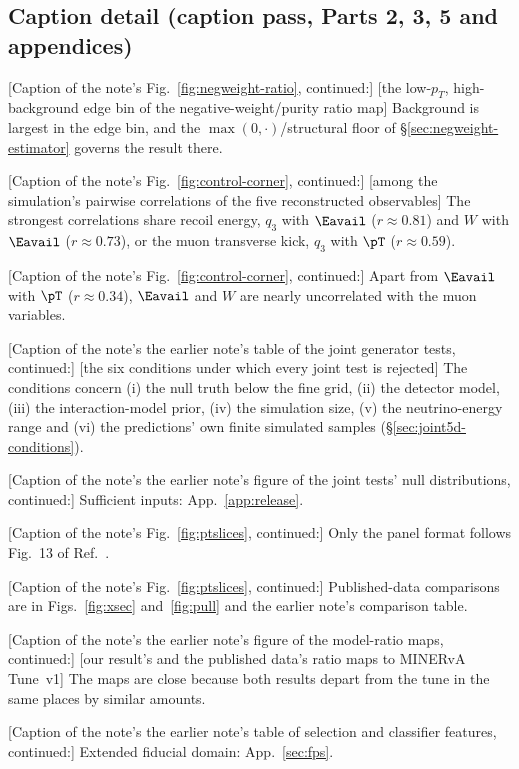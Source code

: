 \subsection{Caption detail (caption pass, Parts 2, 3, 5 and appendices)}

[Caption of the note's Fig.~\ref{fig:negweight-ratio}, continued:] [the low-$p_T$, high-background edge bin of the negative-weight/purity ratio map] Background is largest in the edge bin, and the $\max(0,\cdot)$/structural floor of \S\ref{sec:negweight-estimator} governs the result there.

[Caption of the note's Fig.~\ref{fig:control-corner}, continued:] [among the simulation's pairwise correlations of the five reconstructed observables] The strongest correlations share recoil energy, $q_{3}$ with $\Eavail$ ($r\approx0.81$) and $W$ with $\Eavail$ ($r\approx0.73$), or the muon transverse kick, $q_{3}$ with $\pT$ ($r\approx0.59$).

[Caption of the note's Fig.~\ref{fig:control-corner}, continued:] Apart from $\Eavail$ with $\pT$ ($r\approx0.34$), $\Eavail$ and $W$ are nearly uncorrelated with the muon variables.

[Caption of the note's the earlier note's table of the joint generator tests, continued:] [the six conditions under which every joint test is rejected] The conditions concern (i) the null truth below the fine grid, (ii) the detector model, (iii) the interaction-model prior, (iv) the simulation size, (v) the neutrino-energy range and (vi) the predictions' own finite simulated samples (\S\ref{sec:joint5d-conditions}).

[Caption of the note's the earlier note's figure of the joint tests' null distributions, continued:] Sufficient inputs: App.~\ref{app:release}.

[Caption of the note's Fig.~\ref{fig:ptslices}, continued:] Only the panel format follows Fig.~13 of Ref.~\cite{MINERvA:2021owq}.

[Caption of the note's Fig.~\ref{fig:ptslices}, continued:] Published-data comparisons are in Figs.~\ref{fig:xsec} and~\ref{fig:pull} and the earlier note's comparison table.

[Caption of the note's the earlier note's figure of the model-ratio maps, continued:] [our result's and the published data's ratio maps to MINERvA Tune~v1] The maps are close because both results depart from the tune in the same places by similar amounts.

[Caption of the note's the earlier note's table of selection and classifier features, continued:] Extended fiducial domain: App.~\ref{sec:fps}.
